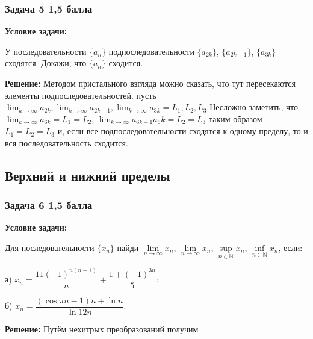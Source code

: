 \documentclass[a4paper,12pt]{article}
\begin{document}
\subsubsection{Задача 5 \hfill 1,5 балла}

\textbf{Условие задачи:}

У последовательности \( \{ a_n \} \) подпоследовательности \( \{ a_{2k} \} \), \( \{ a_{2k-1} \} \), \( \{ a_{3k} \} \) сходятся. Докажи, что \( \{ a_n \} \) сходится.

\textbf{Решение: }
Методом пристального взгляда можно сказать, что тут пересекаются элементы подпоследовательностей.
пусть $\lim_{k\to \infty}a_{2k}, \lim_{k\to \infty}a_{2k-1}, \lim_{k\to \infty}a_{3k} = L_1, L_2, L_3$
Несложно заметить, что $\lim_{k\to \infty}a_{6k} = L_1 = L_2$, $ \lim_{k\to \infty}a_{6k+1} a_6k = L_2 = L_3$ таким образом $L_1=L_2=L_3$ и, если все подпоследовательности сходятся к одному пределу, то и вся последовательность сходится.

\vspace{1cm}

\subsection{Верхний и нижний пределы}

\subsubsection{Задача 6 \hfill 1,5 балла}

\textbf{Условие задачи:}

Для последовательности \( \{ x_n \} \) найди \( \lim\limits_{n \to \infty} x_n \), \( \lim\limits_{n \to \infty} x_n \), \( \sup\limits_{n \in \mathbb{N}} x_n \), \( \inf\limits_{n \in \mathbb{N}} x_n \), если:

а) \( x_n = \dfrac{11 (-1)^{n(n - 1)}}{n} + \dfrac{1 + (-1)^{3n}}{5} \);

б) \( x_n = \dfrac{(\cos \pi n - 1) n + \ln n}{\ln 12n} \).

\textbf{Решение: }
Путём нехитрых преобразований получим
\end{document}
